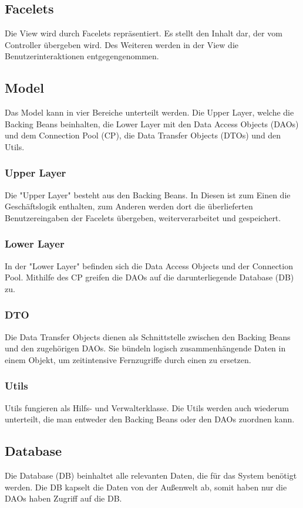     \subsection{Facelets}
    	Die View wird durch Facelets repräsentiert. Es stellt den Inhalt dar, der vom Controller übergeben wird. Des Weiteren werden in der View die Benutzerinteraktionen entgegengenommen. 
   	\subsection{Model}
   	Das Model kann in vier Bereiche unterteilt werden. Die Upper Layer, welche die Backing Beans beinhalten, die Lower Layer mit den Data Access Objects (DAOs) und dem Connection Pool (CP), die Data Transfer Objects (DTOs) und den Utils. 
   		\subsubsection{Upper Layer}
   		Die "Upper Layer" besteht aus den Backing Beans. In Diesen ist zum Einen die Geschäftslogik enthalten, zum Anderen werden dort die überlieferten Benutzereingaben der Facelets übergeben, weiterverarbeitet und gespeichert.
    	\subsubsection{Lower Layer}
    	In der "Lower Layer" befinden sich die Data Access Objects und der Connection Pool. Mithilfe des CP greifen die DAOs auf die darunterliegende Database (DB) zu. 
    	\subsubsection{DTO}
    	Die Data Transfer Objects dienen als Schnittstelle zwischen den Backing Beans und den zugehörigen DAOs. Sie bündeln logisch zusammenhängende Daten in einem Objekt, um zeitintensive Fernzugriffe durch einen zu ersetzen.
    	\subsubsection{Utils}
    	Utils fungieren als Hilfs- und Verwalterklasse. Die Utils werden auch wiederum unterteilt, die man entweder den Backing Beans oder den DAOs zuordnen kann. 
    \subsection{Database}
    Die Database (DB) beinhaltet alle relevanten Daten, die für das System benötigt werden. Die DB kapselt die Daten von der Außenwelt ab, somit haben nur die DAOs haben Zugriff auf die DB. 
